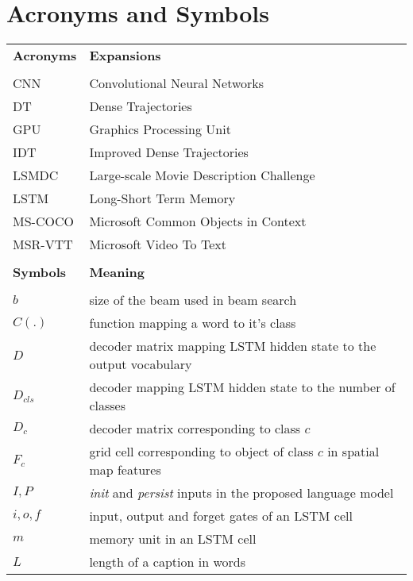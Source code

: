 \chapter*{Acronyms and Symbols}


\noindent
\begingroup
\renewcommand*{\arraystretch}{1.4} 
\begin{longtable}{@{}p{}p{}@{}}
        \bf Acronyms & \bf Expansions\\\\
        CNN & Convolutional Neural Networks\\
        DT & Dense Trajectories \\
        GPU & Graphics Processing Unit \\
        IDT & Improved Dense Trajectories \\
        LSMDC   & Large-scale Movie Description Challenge\\
        LSTM   & Long-Short Term Memory \\
        MS-COCO & Microsoft Common Objects in Context \\
        MSR-VTT& Microsoft Video To Text\\
        \\
        \bf Symbols & \bf Meaning\\\\
        $b$   & size of the beam used in beam search\\
        $C(.)$ & function mapping a word to it's class\\
        $D$ & decoder matrix mapping LSTM hidden state to the output vocabulary\\
        $D_{cls}$ & decoder mapping LSTM hidden state to the number of classes\\
        $D_{c}$ & decoder matrix corresponding to class $c$\\
        $F_c$ & grid cell corresponding to object of class $c$ in spatial map
        features\\
        $I, P$ & \emph{init} and \emph{persist} inputs in the proposed language
        model\\
        $i, o, f $ & input, output and forget gates of an LSTM cell \\
        $m$ & memory unit in an LSTM cell \\
        $L$   & length of a caption in words\\

\end{longtable}
